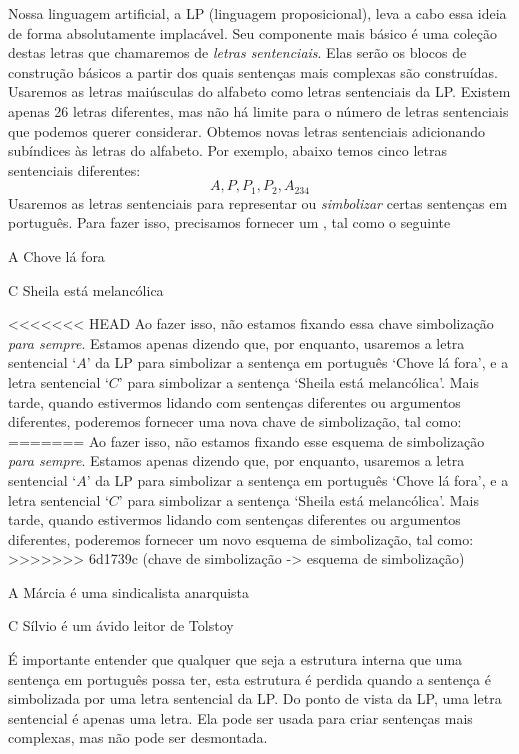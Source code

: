 Nossa linguagem artificial, a LP (linguagem proposicional), leva a cabo essa ideia de forma absolutamente implacável.
Seu componente mais básico é uma coleção destas letras que chamaremos de \emph{letras sentenciais}.
Elas serão os blocos de construção básicos a partir dos quais sentenças mais complexas são construídas.
Usaremos as letras maiúsculas do alfabeto como letras sentenciais da LP.
Existem apenas 26 letras diferentes, mas não há limite para o número de letras sentenciais que podemos querer considerar.
Obtemos novas letras sentenciais adicionando subíndices às letras do alfabeto.
Por exemplo, abaixo temos cinco letras sentenciais diferentes:
	$$A, P, P_1, P_2, A_{234}$$
Usaremos as letras sentenciais para representar ou \emph{simbolizar} certas sentenças em português.
Para fazer isso, precisamos fornecer um , tal como o seguinte
	\begin{ekey}
		\item[A] Chove lá fora
		\item[C] Sheila está melancólica
	\end{ekey}
<<<<<<< HEAD
Ao fazer isso, não estamos fixando essa chave simbolização \emph{para sempre}.
Estamos apenas dizendo que, por enquanto, usaremos a letra sentencial `$A$'  da LP para simbolizar a sentença em português `Chove lá fora', e a letra sentencial `$C$' para simbolizar a sentença `Sheila está melancólica'.
Mais tarde, quando estivermos lidando com sentenças diferentes ou argumentos diferentes, poderemos fornecer uma nova chave de simbolização, tal como:
=======
Ao fazer isso, não estamos fixando esse esquema de simbolização \emph{para sempre}.
Estamos apenas dizendo que, por enquanto, usaremos a letra sentencial `$A$'  da LP para simbolizar a sentença em português `Chove lá fora', e a letra sentencial `$C$' para simbolizar a sentença `Sheila está melancólica'.
Mais tarde, quando estivermos lidando com sentenças diferentes ou argumentos diferentes, poderemos fornecer um novo esquema de simbolização, tal como:
>>>>>>> 6d1739c (chave de simbolização -> esquema de simbolização)
	\begin{ekey}
		\item[A] Márcia é uma sindicalista anarquista
		\item[C] Sílvio é um ávido leitor de Tolstoy
	\end{ekey}
É importante entender que qualquer que seja a estrutura interna que uma sentença em português possa ter, esta estrutura é perdida quando a sentença é simbolizada por uma letra sentencial da LP.
Do ponto de vista da LP, uma letra sentencial é apenas uma letra.
Ela pode ser usada para criar sentenças mais complexas, mas não pode ser desmontada.

